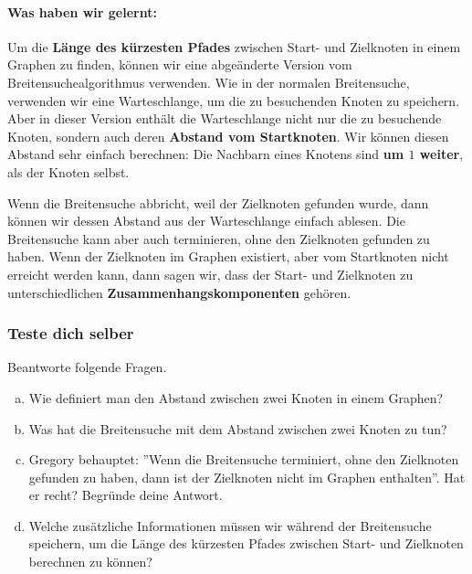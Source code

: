 \begin{framed}
\paragraph{\textcolor{blue-violet}{Was haben wir gelernt:}}
Um die \textbf{Länge des kürzesten Pfades} zwischen Start- und Zielknoten in einem Graphen zu finden, können wir eine abgeänderte Version vom Breitensuchealgorithmus verwenden. Wie in der normalen Breitensuche, verwenden wir eine Warteschlange, um die zu besuchenden Knoten zu speichern. Aber in dieser Version enthält die Warteschlange nicht nur die zu besuchende Knoten, sondern auch deren \textbf{Abstand vom Startknoten}. Wir können diesen Abstand sehr einfach berechnen: Die Nachbarn eines Knotens sind \textbf{um \(1\) weiter}, als der Knoten selbst.

Wenn die Breitensuche abbricht, weil der Zielknoten gefunden wurde, dann können wir dessen Abstand aus der Warteschlange einfach ablesen. Die Breitensuche kann aber auch terminieren, ohne den Zielknoten gefunden zu haben. Wenn der Zielknoten im Graphen existiert, aber vom Startknoten nicht erreicht werden kann, dann sagen wir, dass der Start- und Zielknoten zu unterschiedlichen \textbf{Zusammenhangskomponenten} gehören.
\end{framed}


\subsubsection*{\textcolor{blue-violet}{Teste dich selber}}
\begin{aufgabe}\label{laenge_kontrollfragen}
Beantworte folgende Fragen.
\begin{enumerate}[(a)]
\item Wie definiert man den Abstand zwischen zwei Knoten in einem Graphen?
\item Was hat die Breitensuche mit dem Abstand zwischen zwei Knoten zu tun?
\item Gregory behauptet: ''Wenn die Breitensuche terminiert, ohne den Zielknoten gefunden zu haben, dann ist der Zielknoten nicht im Graphen enthalten''. Hat er recht? Begründe deine Antwort.
\item Welche zusätzliche Informationen müssen wir während der Breitensuche speichern, um die Länge des kürzesten Pfades zwischen Start- und Zielknoten berechnen zu können?
\end{enumerate}
\end{aufgabe}


